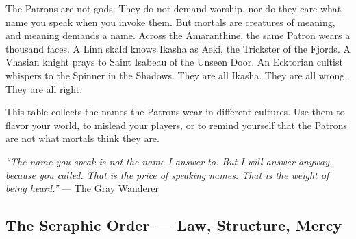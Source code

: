 \begin{tcolorbox}[colback=blue!5!white,colframe=blue!75!black,title=On Names and Masks,breakable]
The Patrons are not gods. They do not demand worship, nor do they care what name you speak when you invoke them. But mortals are creatures of meaning, and meaning demands a name. Across the Amaranthine, the same Patron wears a thousand faces. A Linn skald knows Ikasha as Aeki, the Trickster of the Fjords. A Vhasian knight prays to Saint Isabeau of the Unseen Door. An Ecktorian cultist whispers to the Spinner in the Shadows. They are all Ikasha. They are all wrong. They are all right.

This table collects the names the Patrons wear in different cultures. Use them to flavor your world, to mislead your players, or to remind yourself that the Patrons are not what mortals think they are.

\textit{``The name you speak is not the name I answer to. But I will answer anyway, because you called. That is the price of speaking names. That is the weight of being heard.''}
--- The Gray Wanderer
\end{tcolorbox}

\subsection{The Seraphic Order --- Law, Structure, Mercy}

